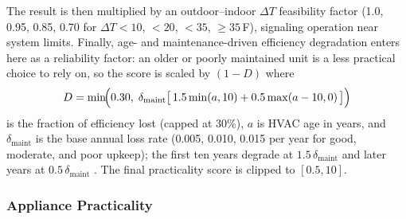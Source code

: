 \documentclass[final,3p,times]{elsarticle}
\begin{document}
The result is then multiplied by an outdoor--indoor $\Delta T$ feasibility factor (1.0, 0.95, 0.85, 0.70 for $\Delta T < 10$, $< 20$, $< 35$, $\ge 35$\,\textdegree{}F), signaling operation near system limits. Finally, age- and maintenance-driven efficiency degradation enters here as a reliability factor: an older or poorly maintained unit is a less practical choice to rely on, so the score is scaled by $(1 - D)$ where
\begin{equation}
  D = \min\!\Bigl(0.30,\; \delta_{\mathrm{maint}}\bigl[\,1.5\min(a,10) + 0.5\max(a-10,0)\,\bigr]\Bigr)
  \label{eq:hvac_degradation}
\end{equation}
\noindent is the fraction of efficiency lost (capped at 30\%), $a$ is HVAC age in years, and $\delta_{\mathrm{maint}}$ is the base annual loss rate (0.005, 0.010, 0.015 per year for good, moderate, and poor upkeep); the first ten years degrade at $1.5\,\delta_{\mathrm{maint}}$ and later years at $0.5\,\delta_{\mathrm{maint}}$ \cite{domanski2014}. The final practicality score is clipped to $[0.5, 10]$.

\subsubsection{Appliance Practicality}
\end{document}
